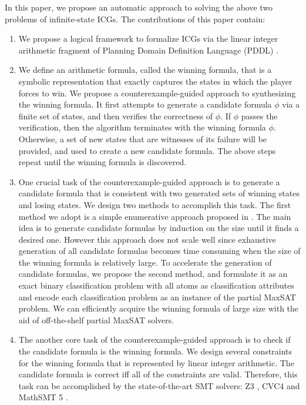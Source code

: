 \documentclass[review]{elsarticle}
\begin{document}
In this paper, we propose an automatic approach to solving the above two problems of infinite-state ICGs.  %
The contributions of this paper contain:
\begin{enumerate}
	\item We propose a logical framework to formalize ICGs via the linear integer arithmetic fragment of Planning Domain Definition Language (PDDL) \cite{FoxL2003}.
	
	\item We define an arithmetic formula, called the winning formula, that is a symbolic representation that exactly captures the states in which the player forces to win.
	We propose a counterexample-guided approach to synthesizing the winning formula.
	It first attempts to generate a candidate formula $\phi$ via a finite set of states, and then verifies the	correctness of $\phi$.
	If $\phi$ passes the verification, then the algorithm terminates with the winning formula $\phi$. Otherwise, a set of new	states that are witnesses of its failure will be provided, and used to create a new candidate formula.
	The above steps repeat until the winning formula is discovered.
		
	\item One crucial task of the counterexample-guided approach is to generate a candidate formula that is consistent with two generated sets of winning states and losing states.
	We design two methods to accomplish this task.	
	The first method we adopt is a simple enumerative approach proposed in \cite{UduRDMMA2013}.
	The main idea is to generate candidate formulas by induction on the	size until it finds a desired one.
	However this approach does not scale well since exhaustive generation of all candidate formulas becomes time consuming when the size of the winning formula is relatively large.
	To accelerate the generation of candidate formulas, we propose the second method, and formulate it as an exact binary classification problem with all atoms as classification attributes and encode each classification problem as an instance of the partial MaxSAT problem.
	We can efficiently acquire the winning formula of large size with the aid of off-the-shelf partial MaxSAT solvers.
	
	\item The another core task of the counterexample-guided approach is to check if the candidate formula is the winning formula.
	We design several constraints for the winning formula that is represented by linear integer	arithmetic.
	The candidate formula is correct iff all of the constraints are valid.
	Therefore, this task can be accomplished by the state-of-the-art SMT solvers: Z3 \cite{MouB2008}, CVC4 \cite{BarCDHJKRT2011} and MathSMT 5 \cite{CimGSS2013}.
	

\end{enumerate}
\end{document}
